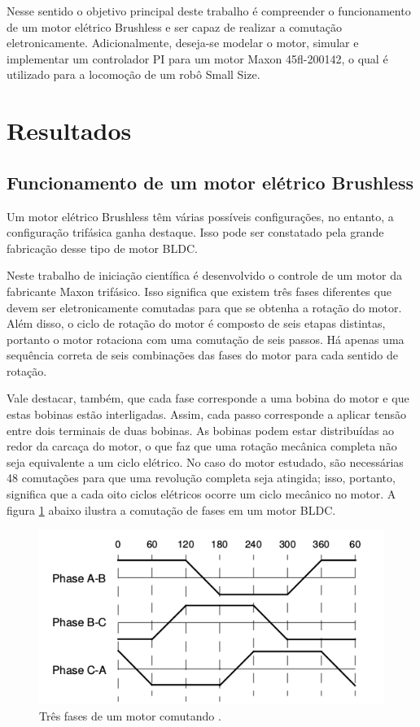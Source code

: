 \documentclass[a4paper,11pt]{article}
\begin{document}
		Nesse sentido o objetivo principal deste trabalho é compreender o funcionamento de um motor elétrico Brushless e ser capaz de realizar a comutação eletronicamente. Adicionalmente, deseja-se modelar o motor, simular e implementar um controlador PI para um motor Maxon 45fl-200142, o qual é utilizado para a locomoção de um robô Small Size.
	
	\section{Resultados}
		\subsection{Funcionamento de um motor elétrico Brushless}
		
		Um motor elétrico Brushless têm várias possíveis configurações, no entanto, a configuração trifásica ganha destaque. Isso pode ser constatado pela grande fabricação desse tipo de motor BLDC.
		
		Neste trabalho de iniciação científica é desenvolvido o controle de um motor da fabricante Maxon trifásico. Isso significa que existem três fases diferentes que devem ser eletronicamente comutadas para que se obtenha a rotação do motor. Além disso, o ciclo de rotação do motor é composto de seis etapas distintas, portanto o motor rotaciona com uma comutação de seis passos. Há apenas uma sequência correta de seis combinações das fases do motor para cada sentido de rotação.
		
		Vale destacar, também, que cada fase corresponde a uma bobina do motor e que estas bobinas estão interligadas. Assim, cada passo corresponde a aplicar tensão entre dois terminais de duas bobinas. As bobinas podem estar distribuídas ao redor da carcaça do motor, o que faz que uma rotação mecânica completa não seja equivalente a um ciclo elétrico. No caso do motor estudado, são necessárias 48 comutações para que uma revolução completa seja atingida; isso, portanto, significa que a cada oito ciclos elétricos ocorre um ciclo mecânico no motor. A figura \ref{fig:comutacao} abaixo ilustra a comutação de fases em um motor BLDC.
		
		\begin{figure}[ht]
			\centering
			\includegraphics[width=0.7\linewidth]{images/comutacao}
			\caption{Três fases de um motor comutando \cite{introducaobldc}.}
			\label{fig:comutacao}
		\end{figure}
		
\end{document}
